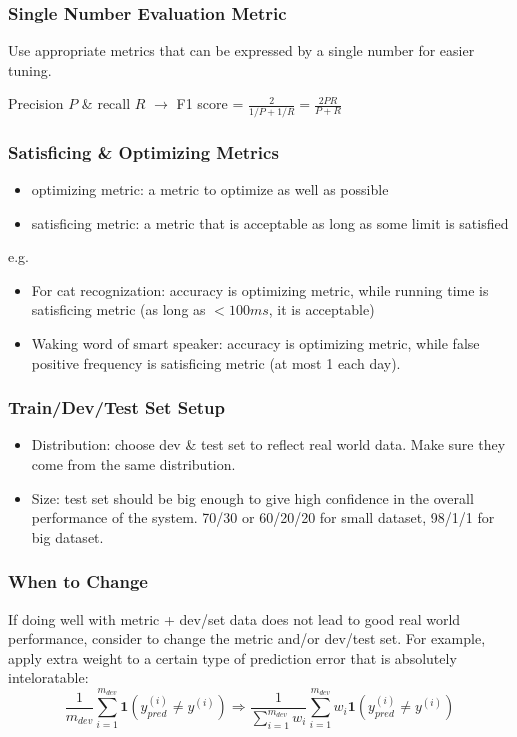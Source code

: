 \subsubsection{Single Number Evaluation Metric}
Use appropriate metrics that can be expressed by a single number for easier tuning.

Precision $P$ \& recall $R$ $\rightarrow$ F1 score = $\frac{2}{1/P+1/R}=\frac{2PR}{P+R}$
\subsubsection{Satisficing \& Optimizing Metrics}
\begin{itemize}
  \item optimizing metric: a metric to optimize as well as possible
  \item satisficing metric: a metric that is acceptable as long as some limit is satisfied
\end{itemize}
e.g. 
\begin{itemize}
  \item For cat recognization: accuracy is optimizing metric, while running time is satisficing metric (as long as $<100ms$, it is acceptable)
  \item Waking word of smart speaker: accuracy is optimizing metric, while false positive frequency is satisficing metric (at most 1 each day).
\end{itemize}
\subsubsection{Train/Dev/Test Set Setup}
\begin{itemize}
  \item Distribution: choose dev \& test set to reflect real world data. Make sure they come from the same distribution.
  \item Size: test set should be big enough to give high confidence in the overall performance of the system. 70/30 or 60/20/20 for small dataset, 98/1/1 for big dataset.
\end{itemize}
\subsubsection{When to Change}
If doing well with metric + dev/set data does not lead to good real world performance, consider to change the metric and/or dev/test set. For example, apply extra weight to a certain type of prediction error that is absolutely inteloratable:
\[\frac{1}{m_{dev}}\displaystyle\sum_{i=1}^{m_{dev}}\mathbf{1}\left(y^{(i)}_{pred}\neq y^{(i)}\right)\Rightarrow\frac{1}{\sum_{i=1}^{m_{dev}}w_i}\displaystyle\sum_{i=1}^{m_{dev}}w_i\mathbf{1}\left(y^{(i)}_{pred}\neq y^{(i)}\right)\]
